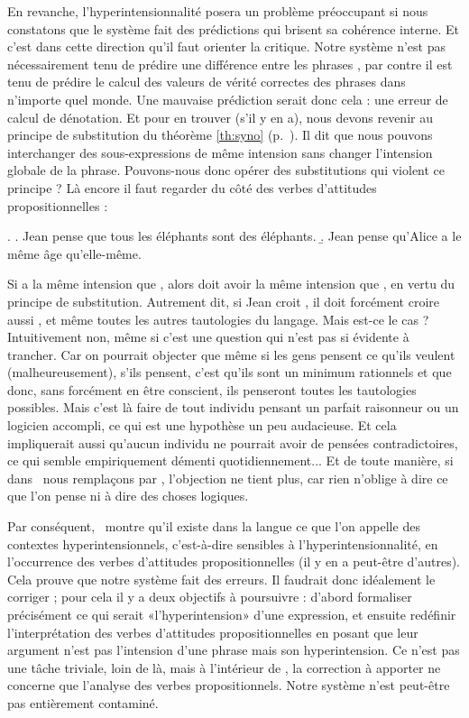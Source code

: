 En revanche, l'hyperintensionnalité posera un problème préoccupant si nous constatons que le système fait des prédictions qui brisent sa cohérence interne. 
Et c'est dans cette direction qu'il faut orienter la critique. 
Notre système n'est pas nécessairement tenu de prédire une différence entre les phrases \Last, par contre il est tenu de prédire le calcul des valeurs de vérité correctes des phrases dans n'importe quel monde. 
Une mauvaise prédiction serait donc cela : une erreur de calcul de dénotation. 
Et pour en trouver (s'il y en a), nous devons revenir au principe de substitution du théorème \ref{th:syno} (p.~\pageref{th:syno}).  Il dit que nous pouvons interchanger des sous-expressions de même intension sans changer l'intension globale de la phrase. 
Pouvons-nous donc opérer des substitutions qui violent ce principe ? Là encore il faut regarder du côté des verbes d'attitudes propositionnelles :

\ex.
\a. Jean pense que tous les éléphants sont des éléphants.
\b. Jean pense qu'Alice a le même âge qu'elle-même.


Si \LLast[a] a la même intension que \LLast[b], alors \Last[a] doit avoir la même intension que \Last[b], en vertu du principe de substitution. Autrement dit, si Jean croit \LLast[a], il doit forcément croire aussi \LLast[b], et même  toutes les autres tautologies du langage. Mais est-ce le cas ? 
Intuitivement non, même si c'est une question qui n'est pas si évidente à trancher. Car on pourrait objecter que même si les gens pensent ce qu'ils veulent (malheureusement), s'ils pensent, c'est qu'ils sont un minimum rationnels et que donc, sans forcément en être conscient, ils penseront toutes les tautologies possibles. Mais c'est là faire de tout individu pensant un parfait raisonneur ou un logicien accompli, ce qui est une hypothèse un peu audacieuse. 
Et cela impliquerait aussi qu'aucun individu ne pourrait avoir de pensées contradictoires, ce qui semble empiriquement démenti quotidiennement... 
Et de toute manière, si dans \Last\ nous remplaçons  par , l'objection ne tient plus, car rien n'oblige à dire ce que l'on pense ni à dire des choses logiques. 

Par conséquent, \Last\ montre qu'il existe dans la langue ce que l'on appelle des contextes hyperintensionnels, c'est-à-dire sensibles à l'hyperintensionnalité, en l'occurrence des verbes d'attitudes propositionnelles (il y en a peut-être d'autres).  Cela prouve que notre système fait des erreurs. 
Il faudrait donc idéalement le corriger ; pour cela il y a deux objectifs à poursuivre : d'abord formaliser précisément ce qui serait «l'hyperintension» d'une expression, et ensuite redéfinir l'interprétation des verbes d'attitudes propositionnelles en posant que leur argument n'est pas l'intension d'une phrase mais son hyperintension.  Ce n'est pas une tâche triviale, loin de là, mais à l'intérieur de \LO, la correction à apporter ne concerne que l'analyse des verbes propositionnels. Notre système n'est peut-être pas entièrement contaminé. 

